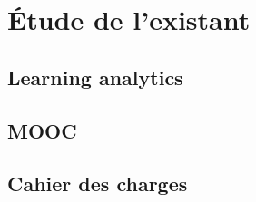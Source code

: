 \chapter{Étude de l’existant}

    \section{Learning analytics}
    \section{MOOC}
    \section{Cahier des charges}